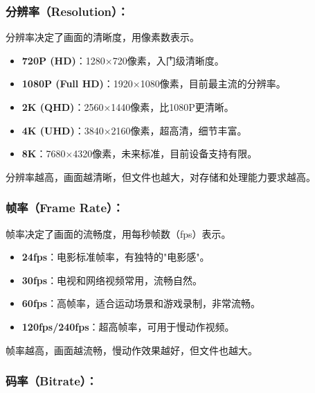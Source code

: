 


\subsubsection*{分辨率（Resolution）：}

分辨率决定了画面的清晰度，用像素数表示。

\begin{itemize}
  \item \textbf{720P (HD)}：1280×720像素，入门级清晰度。
  \item \textbf{1080P (Full HD)}：1920×1080像素，目前最主流的分辨率。
  \item \textbf{2K (QHD)}：2560×1440像素，比1080P更清晰。
  \item \textbf{4K (UHD)}：3840×2160像素，超高清，细节丰富。
  \item \textbf{8K}：7680×4320像素，未来标准，目前设备支持有限。
\end{itemize}

分辨率越高，画面越清晰，但文件也越大，对存储和处理能力要求越高。

\subsubsection*{帧率（Frame Rate）：}

帧率决定了画面的流畅度，用每秒帧数（fps）表示。

\begin{itemize}
  \item \textbf{24fps}：电影标准帧率，有独特的"电影感"。
  \item \textbf{30fps}：电视和网络视频常用，流畅自然。
  \item \textbf{60fps}：高帧率，适合运动场景和游戏录制，非常流畅。
  \item \textbf{120fps/240fps}：超高帧率，可用于慢动作视频。
\end{itemize}

帧率越高，画面越流畅，慢动作效果越好，但文件也越大。

\subsubsection*{码率（Bitrate）：}


